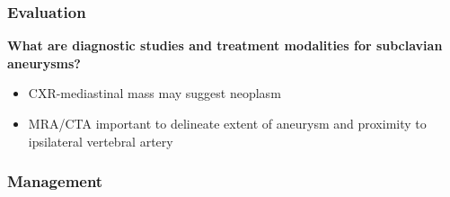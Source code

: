 \documentclass[
]{book}
\begin{document}
\hypertarget{evaluation-1}{%
\subsubsection{Evaluation}\label{evaluation-1}}

\textbf{What are diagnostic studies and treatment modalities for subclavian
aneurysms?}

\begin{itemize}
\item
  CXR-mediastinal mass may suggest neoplasm
\item
  MRA/CTA important to delineate extent of aneurysm and proximity to
  ipsilateral vertebral artery
\end{itemize}

\hypertarget{management-2}{%
\subsubsection{Management}\label{management-2}}
\end{document}
